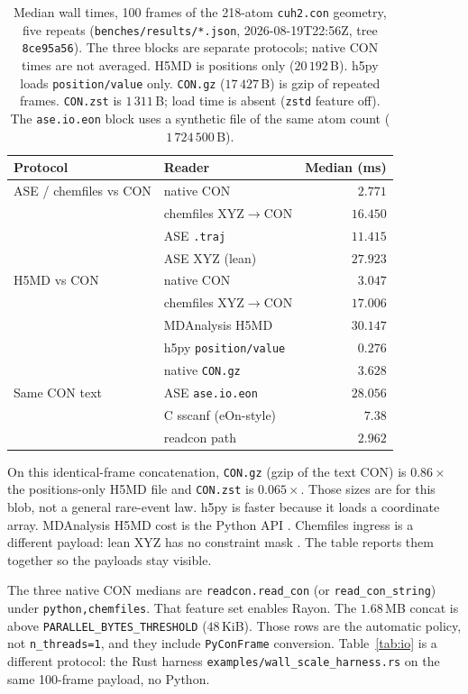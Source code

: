 \documentclass[preprint,12pt]{elsarticle}
\begin{document}
\begin{table}[ht]
\centering
\caption{Median wall times, 100 frames of the 218-atom
\texttt{cuh2.con} geometry, five repeats
(\texttt{benches/results/*.json}, 2026-08-19T22:56Z, tree
\texttt{8ce95a56}). The three blocks are separate protocols; native
CON times are not averaged. H5MD is positions only
($20\,192$\,B). h5py loads \texttt{position/value} only.
\texttt{CON.gz} ($17\,427$\,B) is gzip of repeated frames.
\texttt{CON.zst} is $1\,311$\,B; load time is absent (\texttt{zstd}
feature off). The \texttt{ase.io.eon} block uses a synthetic file
of the same atom count ($1\,724\,500$\,B).}
\label{tab:wall}
\begin{tabular}{@{}llr@{}}
\toprule
Protocol & Reader & Median (ms) \\
\midrule
ASE / chemfiles vs CON & native CON & $2.771$ \\
 & chemfiles XYZ$\to$CON & $16.450$ \\
 & ASE \texttt{.traj} & $11.415$ \\
 & ASE XYZ (lean) & $27.923$ \\
\midrule
H5MD vs CON & native CON & $3.047$ \\
 & chemfiles XYZ$\to$CON & $17.006$ \\
 & MDAnalysis H5MD & $30.147$ \\
 & h5py \texttt{position/value} & $0.276$ \\
 & native \texttt{CON.gz} & $3.628$ \\
\midrule
Same CON text & ASE \texttt{ase.io.eon} & $28.056$ \\
 & C sscanf (eOn-style) & $7.38$ \\
 & readcon path & $2.962$ \\
\bottomrule
\end{tabular}
\end{table}

On this identical-frame concatenation, \texttt{CON.gz} (gzip of the
text CON) is $0.86\times$ the positions-only H5MD file and
\texttt{CON.zst} is $0.065\times$. Those sizes are for this blob,
not a general rare-event law. h5py is faster because it loads a
coordinate array. MDAnalysis H5MD cost is the Python API
\cite{gowersMDAnalysisPythonPackage2016}. Chemfiles ingress is a
different payload: lean XYZ has no constraint mask
\cite{frauxChemfiles2023}. The table reports them together so the
payloads stay visible.

The three native CON medians are \texttt{readcon.read\_con} (or
\texttt{read\_con\_string}) under \texttt{python,chemfiles}. That
feature set enables Rayon. The $1.68$\,MB concat is above
\texttt{PARALLEL\_BYTES\_THRESHOLD} ($48$\,KiB). Those rows are the
automatic policy, not \texttt{n\_threads=1}, and they include
\texttt{PyConFrame} conversion. Table~\ref{tab:io} is a different
protocol: the Rust harness
\texttt{examples/wall\_scale\_harness.rs} on the same 100-frame
payload, no Python.
\end{document}
